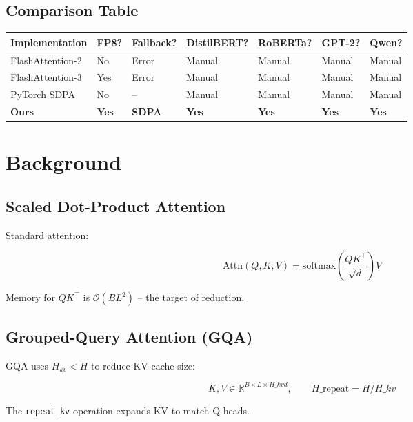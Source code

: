 \subsection{Comparison Table}

\begin{table}[H]
\centering
\small
\begin{tabular}{lllllll}
\toprule
\textbf{Implementation} & \textbf{FP8?} & \textbf{Fallback?} & \textbf{DistilBERT?} & \textbf{RoBERTa?} & \textbf{GPT-2?} & \textbf{Qwen?} \\
\midrule
FlashAttention-2 & No & Error & Manual & Manual & Manual & Manual \\
FlashAttention-3 & Yes & Error & Manual & Manual & Manual & Manual \\
PyTorch SDPA & No & -- & Manual & Manual & Manual & Manual \\
\textbf{Ours} & \textbf{Yes} & \textbf{SDPA} & \textbf{Yes} & \textbf{Yes} & \textbf{Yes} & \textbf{Yes} \\
\bottomrule
\end{tabular}
\end{table}




\section{Background}

\subsection{Scaled Dot-Product Attention}

Standard attention:

\[
\text{Attn}(Q, K, V) = \text{softmax}\!\left(\frac{Q K^\top}{\sqrt{d}}\right) V
\tag{3.1}
\]

Memory for $QK^\top$ is $\mathcal{O}(BL^2)$ -- the target of reduction.

\subsection{Grouped-Query Attention (GQA)}

GQA uses $H_{kv} < H$ to reduce KV-cache size:

\[
K, V \in \mathbb{R}^{B \times L \times H\_{kv} d}, \qquad
H\_{\text{repeat}} = H / H\_{kv}
\tag{3.2}
\]

The \texttt{repeat\_kv} operation expands KV to match Q heads.

